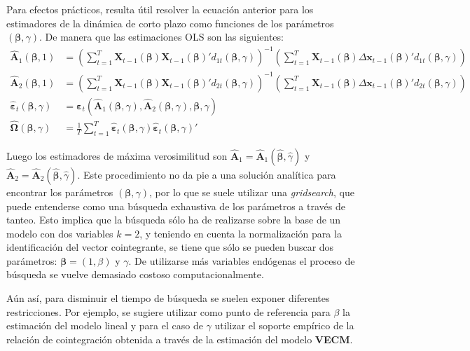 \documentclass[12pt, twoside]{book}\usepackage[]{graphicx}\usepackage[]{color}
\numberwithin{equation}{section}
\numberwithin{theorem}{section}
\numberwithin{teorema}{section}
\numberwithin{defi}{section}
\numberwithin{prop}{section}
\numberwithin{defi}{section}
\theoremstyle{plain}
\begin{document}
Para efectos prácticos, resulta útil resolver la ecuación anterior para los estimadores de la dinámica de corto plazo como funciones de los parámetros $(\boldsymbol{\beta},\gamma)$. De manera que las estimaciones OLS son las siguientes: 
\begin{align}
\hat{\mathbf{A}}_{1}(\boldsymbol{\beta},1) & = \left(\sum_{t=1}^{T}\mathbf{X}_{t-1}(\boldsymbol{\beta})\mathbf{X}_{t-1}(\boldsymbol{\beta})'d_{1t}(\boldsymbol{\beta},\gamma)\right)^{-1}\left(\sum_{t=1}^{T}\mathbf{X}_{t-1}(\boldsymbol{\beta})\Delta\mathbf{x}_{t-1}(\boldsymbol{\beta})'d_{1t}(\boldsymbol{\beta},\gamma)\right) \\
\hat{\mathbf{A}}_{2}(\boldsymbol{\beta},1) & = \left(\sum_{t=1}^{T}\mathbf{X}_{t-1}(\boldsymbol{\beta})\mathbf{X}_{t-1}(\boldsymbol{\beta})'d_{2t}(\boldsymbol{\beta},\gamma)\right)^{-1}\left(\sum_{t=1}^{T}\mathbf{X}_{t-1}(\boldsymbol{\beta})\Delta\mathbf{x}_{t-1}(\boldsymbol{\beta})'d_{2t}(\boldsymbol{\beta},\gamma)\right) \\
\hat{\boldsymbol{\varepsilon}}_{t}(\boldsymbol{\beta},\gamma) & =\boldsymbol{\varepsilon}_{t}(\hat{\mathbf{A}}_{1}(\boldsymbol{\beta},\gamma),\hat{\mathbf{A}}_{2}(\boldsymbol{\beta},\gamma),\boldsymbol{\beta},\gamma) \\ 
\hat{\boldsymbol{\Omega}}(\boldsymbol{\beta},\gamma) & = \frac{1}{T}\sum_{t=1}^{T}\hat{\boldsymbol{\varepsilon}}_{t}(\boldsymbol{\beta},\gamma)\hat{\boldsymbol{\varepsilon}}_{t}(\boldsymbol{\beta},\gamma)'
\end{align}

Luego los estimadores de máxima verosimilitud son $\hat{\mathbf{A}}_{1}=\hat{\mathbf{A}}_{1}(\hat{\boldsymbol{\beta}},\hat{\gamma})$ y $\hat{\mathbf{A}}_{2}=\hat{\mathbf{A}}_{2}(\hat{\boldsymbol{\beta}},\hat{\gamma})$. Este procedimiento no da pie a una solución analítica para encontrar los parámetros $(\boldsymbol{\beta},\gamma)$, por lo que se suele utilizar una \textit{gridsearch}, que puede entenderse como una búsqueda exhaustiva de los parámetros a través de tanteo. Esto implica que la búsqueda sólo ha de realizarse sobre la base de un modelo con dos variables $k=2$, y teniendo en cuenta la normalización para la identificación del vector cointegrante, se tiene que sólo se pueden buscar dos parámetros: $\boldsymbol{\beta}=(1,\beta)$ y $\gamma$. De utilizarse más variables endógenas el proceso de búsqueda se vuelve demasiado costoso computacionalmente. 

Aún así, para disminuir el tiempo de búsqueda se suelen exponer diferentes restricciones. Por ejemplo, se sugiere utilizar como punto de referencia para $\beta$ la estimación del modelo lineal y para el caso de $\gamma$ utilizar el soporte empírico de la relación de cointegración obtenida a través de la estimación del modelo \textbf{VECM}.
\end{document}
